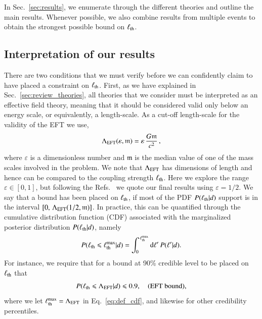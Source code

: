 \documentclass[twocolumn,
               prd,
               aps,
               superscriptaddress,
               tightenlines,
               nofootinbib,
               eqsecnum,
               amsfonts,
               amsmath,
               longbibliography]{revtex4-1}
\newcommand{\dd}{{\rm d}}
\begin{document}
In Sec.~\ref{sec:results}, we enumerate through the different theories and
outline the main results. Whenever possible, we also combine results from
multiple events to obtain the strongest possible bound on $\ell_{\rm th}$.

\subsection{Interpretation of our results}
\label{sec:remarks}

There are two conditions that we must verify before we can confidently claim to
have placed a constraint on $\ell_{\rm th}$. First, as we have explained in Sec.~\ref{sec:review_theories}, all theories that we
consider must be interpreted as an effective field theory, meaning that it should be
considered valid only below an energy scale, or equivalently, a length-scale.
%
As a cut-off length-scale for the validity of the EFT we use,
%
\begin{equation}
\Lambda_{\rm EFT} (\varepsilon, \mathfrak{m}) = \varepsilon \, \frac{G \mathfrak{m}}{c^2} \,,
\label{eq:def_cutoff}
\end{equation}
%
where $\varepsilon$ is a dimensionless number and $\mathfrak{m}$ is the median
value of one of the mass scales involved in the problem.
%
We note that $\Lambda_{\rm EFT}$ has dimensions of length and hence can be compared to the coupling strength $\ell_{\rm th}$.
%
Here we explore the range $\varepsilon \in [0, 1]$, but following
the Refs.~\cite{Nair:2019iur,Perkins:2021mhb,Lyu:2022gdr} we quote our final results using
$\varepsilon = 1/2$.
We say that a bound has been placed on $\ell_{\rm th}$, if most of the PDF $P(\ell_{\rm th} | d)$ support is in the interval
$[0, \, \Lambda_{\rm EFT}(1/2, \mathfrak{m})]$.
%
In practice, this can be quantified through the cumulative distribution function
(CDF) associated with the marginalized posterior distribution $P(\ell_{\rm th} | d)$, namely
%
\begin{equation}
P(\ell_{\rm th} \leqslant \ell^{\rm max}_{\rm th} | d) = \int_{0}^{\,\ell^{\rm max}_{\rm th}} \dd \ell'\, P(\ell' | d).
\label{eq:def_cdf}
\end{equation}
%
For instance, we require that for a bound at 90\% credible level to be placed on $\ell_{\rm th}$ that
%
\begin{equation}
P(\ell_{\rm th} \leqslant \Lambda_{\rm EFT} | d) \leqslant 0.9,
\quad \textrm{(EFT bound)},
\label{eq:eft_bound}
\end{equation}
%
where we let $\ell^{\rm max}_{\rm th} = \Lambda_{\rm EFT}$ in Eq.~\eqref{eq:def_cdf}, and
likewise for other credibility percentiles.
\end{document}

